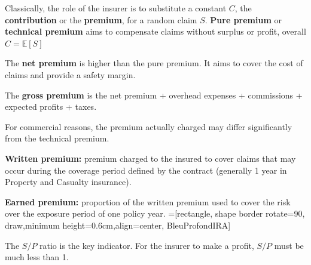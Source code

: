 \begin{f}
Classically, the role of the insurer is to substitute a constant \(C\), the \textbf{contribution} or the \textbf{premium}, for a random claim \(S\).
\textbf{Pure premium} or \textbf{technical premium} aims 
to compensate claims without surplus or profit, overall \(C = \mathbb{E}[S]\)
	
	The \textbf{net premium} is higher than the pure premium. It aims to cover the cost of claims and provide a safety margin.
	
	The \textbf{gross premium} is the net premium + overhead expenses + commissions + expected profits + taxes.
	
	For commercial reasons, the premium actually charged may differ significantly from the technical premium.

	\textbf{Written premium:} premium charged to the insured to cover claims that may occur during the 
coverage period defined by the contract (generally 1 year in Property and Casualty insurance).

\textbf{Earned premium:} proportion of the written premium used to cover the risk over the exposure period of 
one policy year.
=[rectangle, shape border rotate=90, draw,minimum height=0.6cm,align=center, BleuProfondIRA]

\resizebox{\linewidth}{!}
{
}
The \(S/P\) ratio is the key indicator. For the insurer to make a profit, \(S/P\) must be much less than 1. 
\end{f}

